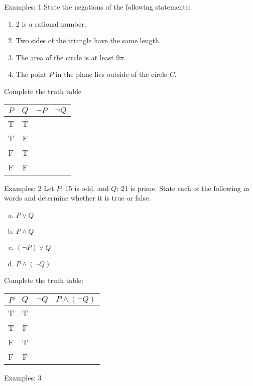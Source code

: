 \documentclass{beamer}
\begin{document}
\begin{frame}{Examples: 1}
    State the negations of the following statements: 
\begin{enumerate}
    \item 2 is a rational number.
    \item Two sides of the triangle have the same length.
    \item The area of the circle is at least $9\pi$.
    \item The point $P$ in the plane lies outside of the circle $C$.
\end{enumerate}
Complete the truth table
\begin{center}
\begin{tabular}{|c|c|c|c|}
    \hline
    $P$ & $Q$ & $\neg P$ & $\neg Q$ \\
    \hline
    T & T & & \\
    T & F & & \\
    F & T & & \\
    F & F & & \\
    \hline
\end{tabular}
\end{center}
    
\end{frame}


\begin{frame}{Examples: 2}
Let $P$: 15 is odd. and $Q$: 21 is prime.
State each of the following in words and determine whether it is true or false.
\begin{enumerate}[(a)]
    \item $P \lor Q$
    \item $P \land Q$
    \item $(\neg P) \lor Q$
    \item $P \land (\neg Q)$
\end{enumerate}
Complete the truth table: \begin{center}
\begin{tabular}{|c|c|c|c|}
    \hline
    $P$ & $Q$ & $\neg Q$ & $P \land (\neg Q)$ \\
    \hline
    T & T &  &  \\
    T & F &  &  \\
    F & T &  &  \\
    F & F &  &  \\
    \hline
\end{tabular}
\end{center}
    
\end{frame}


\begin{frame}{Examples: 3}

\end{frame}
\end{document}
